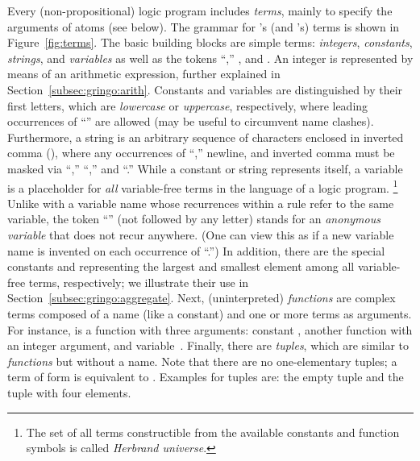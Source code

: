 Every (non-propositional) logic program includes \emph{terms},
mainly to specify the arguments of atoms (see below).
The grammar for \gringo's (and \clingo's) terms is shown in Figure~\ref{fig:terms}.
The basic building blocks are simple terms:
\emph{integers}, \emph{constants}, \emph{strings}, and \emph{variables}
as well as the tokens ``,'' , and .
An integer is represented by means of an arithmetic expression,
further explained in Section~\ref{subsec:gringo:arith}.
Constants and variables are distinguished by their first letters, 
which are \emph{lowercase} or \emph{uppercase}, respectively,
where leading occurrences of ``'' are allowed
(may be useful to circumvent name clashes).
Furthermore, a string is an arbitrary sequence of characters
enclosed in inverted comma (),
where any occurrences of ``\code{\textbackslash},'' newline, and inverted comma
must be masked via ``\code{\textbackslash\textbackslash},'' ``,''
and ``.''
While a constant or string represents itself,
a variable is a placeholder for \emph{all} variable-free terms
in the language of a logic program.%
\footnote{The set of all terms constructible from the available
          constants and function symbols is called \emph{Herbrand universe}.}
Unlike with a variable name whose recurrences within a rule refer to the same variable,
the token ``'' (not followed by any letter)
stands for an \emph{anonymous variable} that does not recur anywhere. 
(One can view this as if a new variable name is invented on each
 occurrence of ``.'')
In addition, there are the special constants  and 
representing the largest and smallest element among all variable-free terms, respectively;
we illustrate their use in Section~\ref{subsec:gringo:aggregate}.
Next, (uninterpreted) \emph{functions} are complex terms composed of a name (like a constant)
and one or more terms as arguments. %
For instance, 
is a function with three arguments:
constant , another function 
with an integer argument, and variable~.
Finally, there are \emph{tuples}, which are similar to \emph{functions} but without a name.
Note that there are no one-elementary tuples; a term of form  is equivalent to .
Examples for tuples are:
the empty tuple \code{()} and 
the tuple  with four elements.

